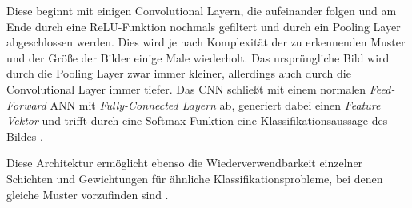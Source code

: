 Diese beginnt mit einigen Convolutional Layern, die aufeinander folgen und am Ende durch eine ReLU-Funktion nochmals gefiltert und durch ein Pooling Layer abgeschlossen werden. Dies wird je nach Komplexität der zu erkennenden Muster und der Größe der Bilder einige Male wiederholt. Das ursprüngliche Bild wird durch die Pooling Layer zwar immer kleiner, allerdings auch durch die Convolutional Layer immer tiefer. Das CNN schließt mit einem normalen \textit{Feed-Forward} ANN mit \textit{Fully-Connected Layern} ab, generiert dabei einen \textit{Feature Vektor} und trifft durch eine Softmax-Funktion eine Klassifikationsaussage des Bildes \cite{AurelienGeron.2018}. 

Diese Architektur ermöglicht ebenso die Wiederverwendbarkeit einzelner Schichten und Gewichtungen für ähnliche Klassifikationsprobleme, bei denen gleiche Muster vorzufinden sind \cite{AurelienGeron.2018}.
